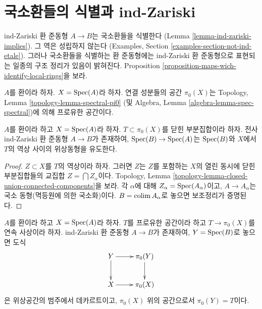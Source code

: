 \section{국소환들의 식별과 ind-Zariski}
\label{section-connected-components}

\noindent
ind-Zariski 환 준동형 $A \to B$는 국소환들을 식별한다
(Lemma \ref{lemma-ind-zariski-implies}). 그 역은 성립하지 않는다
(Examples, Section \ref{examples-section-not-ind-etale}).
그러나 국소환들을 식별하는 환 준동형에는 ind-Zariski 환 준동형으로
표현되는 일종의 구조 정리가 있음이 밝혀진다.
Proposition \ref{proposition-maps-wich-identify-local-rings}을 보라.

\medskip\noindent
$A$를 환이라 하자. $X = \mathop{\mathrm{Spec}}(A)$라 하자. 연결 성분들의 공간
$\pi_0(X)$는 Topology, Lemma \ref{topology-lemma-spectral-pi0}
(및 Algebra, Lemma \ref{algebra-lemma-spec-spectral})에 의해
프로유한 공간이다.

\begin{lemma}
\label{lemma-construct}
$A$를 환이라 하고 $X = \mathop{\mathrm{Spec}}(A)$라 하자.
$T \subset \pi_0(X)$를 닫힌 부분집합이라 하자. 전사 ind-Zariski
환 준동형 $A \to B$가 존재하여, $\mathop{\mathrm{Spec}}(B) \to \mathop{\mathrm{Spec}}(A)$는
$\mathop{\mathrm{Spec}}(B)$와 $X$에서 $T$의 역상 사이의 위상동형을 유도한다.
\end{lemma}

\begin{proof}
$Z \subset X$를 $T$의 역상이라 하자. 그러면 $Z$는 $Z$를 포함하는
$X$의 열린 동시에 닫힌 부분집합들의 교집합
$Z = \bigcap Z_\alpha$이다. Topology, Lemma
\ref{topology-lemma-closed-union-connected-components}을 보라.
각 $\alpha$에 대해 $Z_\alpha = \mathop{\mathrm{Spec}}(A_\alpha)$이고,
$A \to A_\alpha$는 국소 동형(멱등원에 의한 국소화)이다.
$B = \mathop{\mathrm{colim}}\nolimits A_\alpha$로 놓으면 보조정리가 증명된다.
\end{proof}

\begin{lemma}
\label{lemma-construct-profinite}
$A$를 환이라 하고 $X = \mathop{\mathrm{Spec}}(A)$라 하자. $T$를 프로유한 공간이라 하고
$T \to \pi_0(X)$를 연속 사상이라 하자. ind-Zariski 환 준동형
$A \to B$가 존재하여, $Y = \mathop{\mathrm{Spec}}(B)$로 놓으면 도식
$$
\xymatrix{
Y \ar[r] \ar[d] & \pi_0(Y) \ar[d] \\
X \ar[r] & \pi_0(X)
}
$$
은 위상공간의 범주에서 데카르트이고,
$\pi_0(X)$ 위의 공간으로서 $\pi_0(Y) = T$이다.
\end{lemma}

